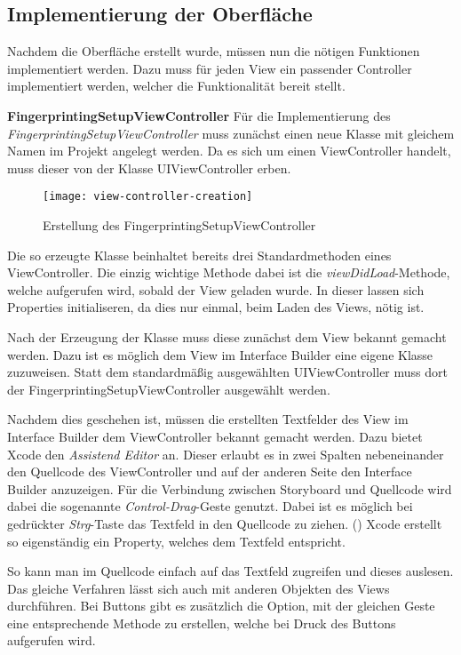 \subsection{Implementierung der Oberfläche}
\label{sec:}

Nachdem die Oberfläche erstellt wurde, müssen nun die nötigen Funktionen implementiert werden. 
Dazu muss für jeden View ein passender Controller implementiert werden, welcher die Funktionalität bereit stellt.


\textbf{FingerprintingSetupViewController}
Für die Implementierung des \emph{FingerprintingSetupViewController} muss zunächst einen neue Klasse mit gleichem Namen im Projekt angelegt werden. 
Da es sich um einen ViewController handelt, muss dieser von der Klasse UIViewController erben.

\begin{figure}[htb!]
		\centering
	\texttt{[image: view-controller-creation]}
	\caption{Erstellung des FingerprintingSetupViewController}
	\label{view-controller-creation}
\end{figure}

Die so erzeugte Klasse beinhaltet bereits drei Standardmethoden eines ViewController. Die einzig wichtige Methode dabei ist die \emph{viewDidLoad}-Methode, welche aufgerufen wird, sobald der View geladen wurde. In dieser lassen sich Properties initialiseren, da dies nur einmal, beim Laden des Views, nötig ist.
 
Nach der Erzeugung der Klasse muss diese zunächst dem View bekannt gemacht werden. Dazu ist es möglich dem View im Interface Builder eine eigene Klasse zuzuweisen. Statt dem standardmäßig ausgewählten UIViewController muss dort der FingerprintingSetupViewController ausgewählt werden.

Nachdem dies geschehen ist, müssen die erstellten Textfelder des View im Interface Builder dem ViewController bekannt gemacht werden. Dazu bietet Xcode den \emph{Assistend Editor} an. Dieser erlaubt es in zwei Spalten nebeneinander den Quellcode des ViewController und auf der anderen Seite den Interface Builder anzuzeigen. Für die Verbindung zwischen Storyboard und Quellcode wird dabei die sogenannte \emph{Control-Drag}-Geste genutzt. Dabei ist es möglich bei gedrückter \emph{Strg}-Taste das Textfeld in den Quellcode zu ziehen. (\citet{cntrldrag})
Xcode erstellt so eigenständig ein Property, welches dem Textfeld entspricht.

So kann man im Quellcode einfach auf das Textfeld zugreifen und dieses auslesen. Das gleiche Verfahren lässt sich auch mit anderen Objekten des Views durchführen. Bei Buttons gibt es zusätzlich die Option, mit der gleichen Geste eine entsprechende Methode zu erstellen, welche bei Druck des Buttons aufgerufen wird.

